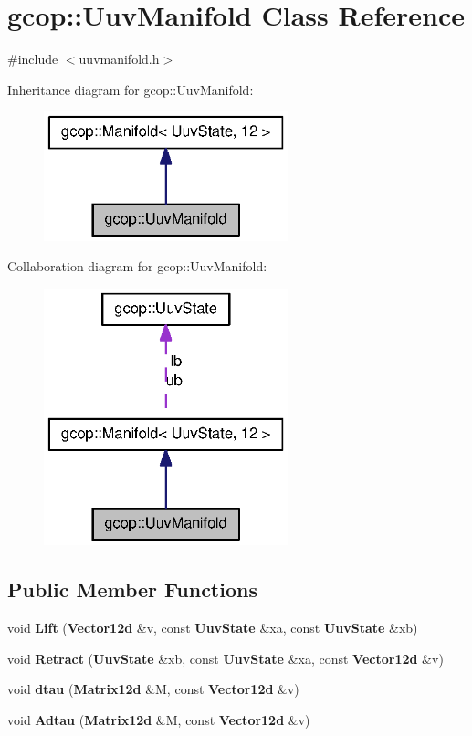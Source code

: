 \section{gcop\-:\-:\-Uuv\-Manifold \-Class \-Reference}
\label{classgcop_1_1UuvManifold}


{\ttfamily \#include $<$uuvmanifold.\-h$>$}



\-Inheritance diagram for gcop\-:\-:\-Uuv\-Manifold\-:
\nopagebreak
\begin{figure}[H]
\begin{center}
\leavevmode
\includegraphics[width=200pt]{classgcop_1_1UuvManifold__inherit__graph}
\end{center}
\end{figure}


\-Collaboration diagram for gcop\-:\-:\-Uuv\-Manifold\-:
\nopagebreak
\begin{figure}[H]
\begin{center}
\leavevmode
\includegraphics[width=200pt]{classgcop_1_1UuvManifold__coll__graph}
\end{center}
\end{figure}
\subsection*{\-Public \-Member \-Functions}
\begin{DoxyCompactItemize}
\item 
void {\bf \-Lift} ({\bf \-Vector12d} \&v, const {\bf \-Uuv\-State} \&xa, const {\bf \-Uuv\-State} \&xb)
\item 
void {\bf \-Retract} ({\bf \-Uuv\-State} \&xb, const {\bf \-Uuv\-State} \&xa, const {\bf \-Vector12d} \&v)
\item 
void {\bf dtau} ({\bf \-Matrix12d} \&\-M, const {\bf \-Vector12d} \&v)
\item 
void {\bf \-Adtau} ({\bf \-Matrix12d} \&\-M, const {\bf \-Vector12d} \&v)
\end{DoxyCompactItemize}
